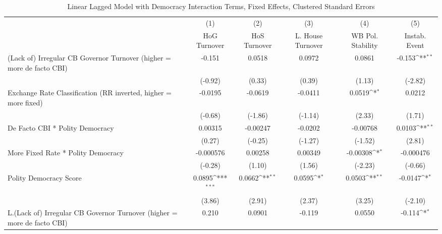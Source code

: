 {
\def\sym#1{\ifmmode^{#1}\else\(^{#1}\)\fi}
\begin{longtable}{l*{5}{c}}
\caption{Linear Lagged Model with Democracy Interaction Terms, Fixed Effects, Clustered Standard Errors \label{demintlagsDF}}\\
\hline\hline\endfirsthead\hline\endhead\hline\endfoot\endlastfoot
                &\multicolumn{1}{c}{(1)}&\multicolumn{1}{c}{(2)}&\multicolumn{1}{c}{(3)}&\multicolumn{1}{c}{(4)}&\multicolumn{1}{c}{(5)}\\
                &\multicolumn{1}{c}{HoG Turnover}&\multicolumn{1}{c}{HoS Turnover}&\multicolumn{1}{c}{L. House Turnover}&\multicolumn{1}{c}{WB Pol. Stability}&\multicolumn{1}{c}{Instab. Event}\\
\hline
(Lack of) Irregular CB Governor Turnover (higher = more de facto CBI)&   -0.151         &   0.0518         &   0.0972         &   0.0861         &   -0.153\sym{**} \\
                &  (-0.92)         &   (0.33)         &   (0.39)         &   (1.13)         &  (-2.82)         \\
[1em]
Exchange Rate Classification (RR inverted, higher = more fixed)&  -0.0195         &  -0.0619         &  -0.0411         &   0.0519\sym{*}  &   0.0212         \\
                &  (-0.68)         &  (-1.86)         &  (-1.14)         &   (2.33)         &   (1.71)         \\
[1em]
De Facto CBI * Polity Democracy&  0.00315         & -0.00247         &  -0.0202         & -0.00768         &   0.0103\sym{**} \\
                &   (0.27)         &  (-0.25)         &  (-1.27)         &  (-1.52)         &   (2.81)         \\
[1em]
More Fixed Rate * Polity Democracy&-0.000576         &  0.00258         &  0.00349         & -0.00308\sym{*}  &-0.000476         \\
                &  (-0.28)         &   (1.10)         &   (1.56)         &  (-2.23)         &  (-0.66)         \\
[1em]
Polity Democracy Score&   0.0895\sym{***}&   0.0662\sym{**} &   0.0595\sym{*}  &   0.0503\sym{**} &  -0.0147\sym{*}  \\
                &   (3.86)         &   (2.91)         &   (2.37)         &   (3.25)         &  (-2.10)         \\
[1em]
L.(Lack of) Irregular CB Governor Turnover (higher = more de facto CBI)&    0.210         &   0.0901         &   -0.119         &   0.0550         &   -0.114\sym{*}  \\

\end{longtable}}
